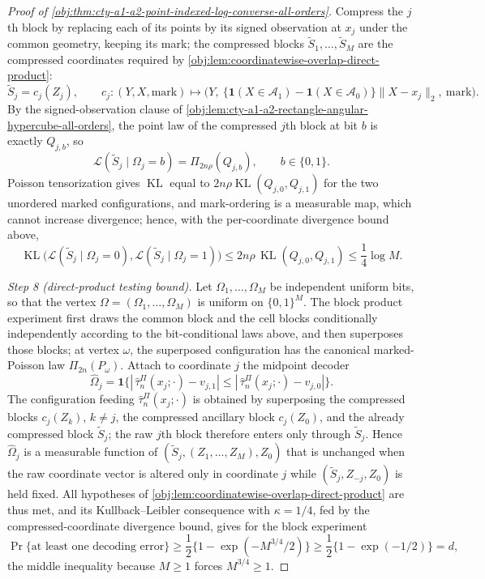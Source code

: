 \begin{proof}[Proof of \cref{obj:thm:cty-a1-a2-point-indexed-log-converse-all-orders}]
Compress the \(j\)th block by replacing each of its points by its signed
observation at \(x_j\) under the common geometry, keeping its mark; the
compressed blocks \(\widetilde S_1,\ldots,\widetilde S_M\) are the compressed
coordinates required by \cref{obj:lem:coordinatewise-overlap-direct-product}:
\[
\widetilde S_j=c_j(Z_j),
\qquad
c_j:(Y,X,\text{mark})\longmapsto
\bigl(Y,\ \{\mathbf 1(X\in\mathcal A_1)-\mathbf 1(X\in\mathcal A_0)\}
\lVert X-x_j\rVert_2,\ \text{mark}\bigr).
\]
By the signed-observation clause of
\cref{obj:lem:cty-a1-a2-rectangle-angular-hypercube-all-orders}, the point law
of the compressed \(j\)th block at bit \(b\) is exactly \(Q_{j,b}\), so
\[
\mathcal L(\widetilde S_j\mid\Omega_j=b)=\Pi_{2n\rho}(Q_{j,b}),
\qquad b\in\{0,1\}.
\]
Poisson tensorization gives
\(\operatorname{KL}\) equal to \(2n\rho\operatorname{KL}(Q_{j,0},Q_{j,1})\) for
the two unordered marked configurations, and mark-ordering is a measurable map,
which cannot increase divergence; hence, with the per-coordinate divergence
bound above,
\[
\operatorname{KL}\bigl(\mathcal L(\widetilde S_j\mid\Omega_j=0),
\mathcal L(\widetilde S_j\mid\Omega_j=1)\bigr)
\leq
2n\rho\,\operatorname{KL}(Q_{j,0},Q_{j,1})
\leq
\frac14\log M .
\]

\emph{Step 8 (direct-product testing bound).}
Let \(\Omega_1,\ldots,\Omega_M\) be independent uniform bits, so that the
vertex \(\Omega=(\Omega_1,\ldots,\Omega_M)\) is uniform on \(\{0,1\}^M\).  The
block product experiment first draws the common block and the cell blocks
conditionally independently according to the bit-conditional laws above, and
then superposes those blocks; at vertex \(\omega\), the superposed configuration
has the canonical marked-Poisson law \(\Pi_{2n}(P_\omega)\).  Attach to
coordinate \(j\) the midpoint decoder
\[
\widehat\Omega_j
=\mathbf 1\bigl\{|\,\widehat\tau^{\Pi}_n(x_j;\cdot)-v_{j,1}|
\leq|\,\widehat\tau^{\Pi}_n(x_j;\cdot)-v_{j,0}|\bigr\}.
\]
The configuration feeding \(\widehat\tau^{\Pi}_n(x_j;\cdot)\) is obtained by
superposing the compressed blocks \(c_j(Z_k)\), \(k\neq j\), the compressed
ancillary block \(c_j(Z_0)\), and the already compressed block
\(\widetilde S_j\); the raw \(j\)th block therefore enters only through
\(\widetilde S_j\).  Hence \(\widehat\Omega_j\) is a measurable function of
\((\widetilde S_j,(Z_1,\ldots,Z_M),Z_0)\) that is unchanged when the raw
coordinate vector is altered only in coordinate \(j\) while
\((\widetilde S_j,Z_{-j},Z_0)\) is held fixed.
All hypotheses of \cref{obj:lem:coordinatewise-overlap-direct-product} are thus
met, and its Kullback--Leibler consequence with \(\kappa=1/4\), fed by the
compressed-coordinate divergence bound, gives for the block experiment
\[
\Pr\{\text{at least one decoding error}\}
\geq
\frac12\bigl\{1-\exp(-M^{3/4}/2)\bigr\}
\geq
\frac12\bigl\{1-\exp(-1/2)\bigr\}
=d,
\]
the middle inequality because \(M\geq1\) forces \(M^{3/4}\geq1\).


\end{proof}
